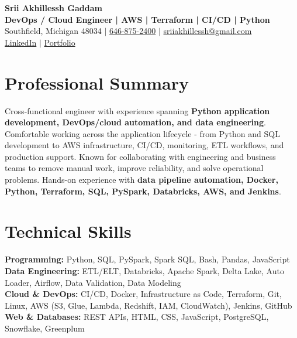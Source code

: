 \documentclass[letterpaper,10pt]{article}
\begin{document}
\fontsize{9.35pt}{10.45pt}\selectfont

\begin{center}
    {\LARGE \textbf{Srii Akhillessh Gaddam}} \\[-1pt]
    \textbf{DevOps / Cloud Engineer | AWS | Terraform | CI/CD | Python} \\[2pt]
    Southfield, Michigan 48034 $|$
    \href{tel:6468752400}{646-875-2400} $|$
    \href{mailto:sriiakhillessh@gmail.com}{sriiakhillessh@gmail.com} \\[1pt]
    \href{https://www.linkedin.com/in/srii-akhiilessh-gaddam-b48668191/}{LinkedIn} $|$
    \href{https://sriiakhillesshg.github.io/portfolio/}{Portfolio}
\end{center}
\vspace{-8pt}

\section{Professional Summary}
\small{Cross-functional engineer with experience spanning \textbf{Python application development, DevOps/cloud automation, and data engineering}. Comfortable working across the application lifecycle - from Python and SQL development to AWS infrastructure, CI/CD, monitoring, ETL workflows, and production support. Known for collaborating with engineering and business teams to remove manual work, improve reliability, and solve operational problems. Hands-on experience with \textbf{data pipeline automation, Docker, Python, Terraform, SQL, PySpark, Databricks, AWS, and Jenkins}.}

\section{Technical Skills}
\small{
\textbf{Programming:} Python, SQL, PySpark, Spark SQL, Bash, Pandas, JavaScript \\
\textbf{Data Engineering:} ETL/ELT, Databricks, Apache Spark, Delta Lake, Auto Loader, Airflow, Data Validation, Data Modeling \\
\textbf{Cloud \& DevOps:} CI/CD, Docker, Infrastructure as Code, Terraform, Git, Linux, AWS (S3, Glue, Lambda, Redshift, IAM, CloudWatch), Jenkins, GitHub \\
\textbf{Web \& Databases:} REST APIs, HTML, CSS, JavaScript, PostgreSQL, Snowflake, Greenplum
}
\end{document}
